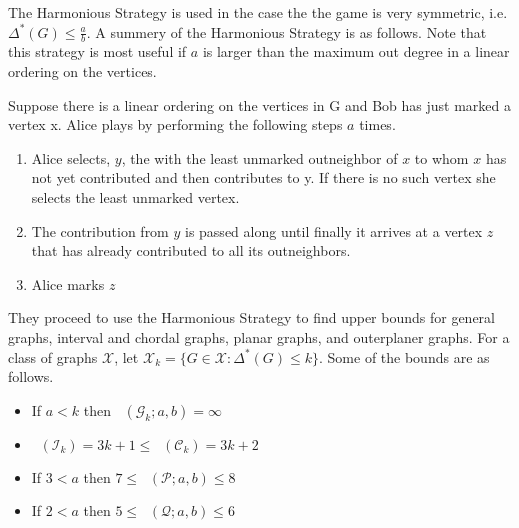 \documentclass[11pt]{article}
\numberwithin{figure}{section}
\theoremstyle{definition}
\newcommand{\PP}{\mathcal{P}} %
\newcommand{\II}{\mathcal{I}_k} %
\newcommand{\QQ}{\mathcal{Q}} %
\newcommand{\CC}{\mathcal{C}} %
\newcommand{\GG}{\mathcal{G}} %
\DeclareMathOperator{\col}{col_g}
\begin{document}
    
    The Harmonious Strategy is used in the case the the game is very symmetric, i.e. $\Delta^*(G)\leq \frac{a}{b}$. A summery of the Harmonious Strategy is as follows. Note that this strategy is most useful if $a$ is larger than the maximum out degree in a linear ordering on the vertices.
    
    Suppose there is a linear ordering on the vertices in G and Bob has just marked a vertex x. Alice plays by performing the following steps $a$ times.    
    \begin{enumerate}
        \item  Alice selects, $y$, the with the least unmarked outneighbor of $x$ to whom $x$ has not yet contributed and then contributes to y. If there is no such vertex she selects the least unmarked vertex.
        \item  The contribution from $y$
         is passed along until finally it arrives at a vertex $z$ that has already
        contributed to all its outneighbors.
        \item  Alice marks $z$
    \end{enumerate}
    
    They proceed to use the Harmonious Strategy to find upper bounds for general graphs, interval and chordal graphs, planar graphs, and outerplaner graphs. For a class of graphs $\mathcal{X}$, let $\mathcal{X}_k= \{G\in\mathcal{X}: \Delta^*(G)\leq k\}$. Some of the bounds are as follows.    
    \begin{itemize}
        \item If $a < k$ then $\col(\GG_k;a,b)=\infty$
        \item $\col(\II)=3k+1\leq\col(\CC_k)=3k+2$
        \item If $3<a $ then $7\leq \col(\PP;a,b)\leq 8$
        \item If $2< a$ then $5\leq \col(\QQ;a,b)\leq 6$
    \end{itemize}
    
\end{document}
